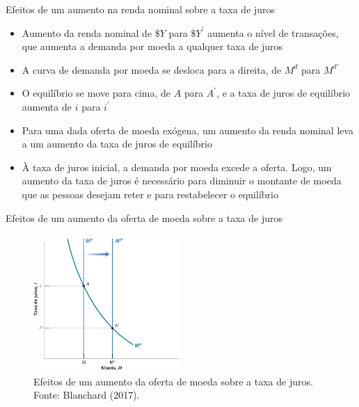 \documentclass[10pt]{beamer}
\begin{document}
\begin{frame}{Efeitos de um aumento na renda nominal sobre a taxa de juros}
\begin{itemize}
    \item Aumento da renda nominal de $\$Y$ para $\$ Y^{'}$ aumenta o nível de transações, que aumenta a demanda por moeda a qualquer taxa de juros
    \bigskip
    \item A curva de demanda por moeda se desloca para a direita, de $M^d$ para $M^{d'}$
    \bigskip
    \item O equilíbrio se move para cima, de $A$ para $A^{'}$, e a taxa de juros de equilíbrio aumenta de $i$ para $i^{'}$
    \bigskip
    \item Para uma dada oferta de moeda exógena, um aumento da renda nominal leva a um aumento da taxa de juros de equilíbrio
    \bigskip
    \item À taxa de juros inicial, a demanda por moeda excede a oferta. Logo, um aumento da taxa de juros é necessário para diminuir o montante de moeda que as pessoas desejam reter e para restabelecer o equilíbrio
\end{itemize}
\end{frame}

\begin{frame}{Efeitos de um aumento da oferta de moeda sobre a taxa de juros}
    \begin{figure}
        \centering
        \includegraphics[width=0.5\textwidth]{./figures/aula072_fig4.JPG}
        \caption{Efeitos de um aumento da oferta de moeda sobre a taxa de juros. Fonte: Blanchard (2017).}
        \label{fig4}
    \end{figure}
\end{frame}
\end{document}
